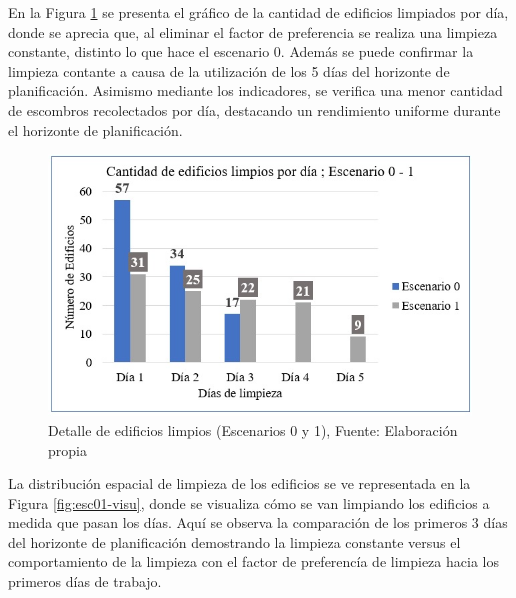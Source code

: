 \documentclass[letterpaper,conference]{IEEEtran}
\begin{document}
En la Figura \ref{fig:esc01graf} se presenta el gráfico de la cantidad de edificios limpiados por día, donde se aprecia que, al eliminar el factor de preferencia se realiza una limpieza constante, distinto lo que hace el escenario 0. Además se puede confirmar la limpieza contante a causa de la utilización de los 5 días del horizonte de planificación. Asimismo mediante los indicadores, se verifica una menor cantidad de escombros recolectados por día, destacando un rendimiento uniforme durante el horizonte de planificación.


\begin{figure}[h!]
\centering
\includegraphics[scale=0.65]{Figuras/INDIC2.jpg} 
\caption{Detalle de edificios limpios (Escenarios 0 y 1), Fuente: Elaboración propia}
\label{fig:esc01graf}
\end{figure}



La distribución espacial de limpieza de los edificios se ve representada en la Figura \ref{fig:esc01-visu}, donde se visualiza cómo se van limpiando los edificios a medida que pasan los días. Aquí se observa la comparación de los primeros 3 días del horizonte de planificación demostrando la limpieza constante versus el comportamiento de la limpieza con el factor de preferencía de limpieza hacia los primeros días de trabajo.
\end{document}
